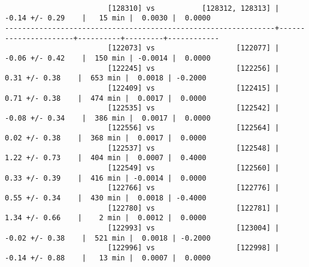 \documentclass[landscape]{article}
\newenvironment{slide}{\mbox{ }\vfill}{\vfill \mbox{ } \pagebreak}
\begin{document}
\begin{slide}
\begin{verbatim}
                        [128310] vs           [128312, 128313] |    -0.14 +/- 0.29    |   15 min |  0.0030 |  0.0000
---------------------------------------------------------------+----------------------+----------+---------+------------
                        [122073] vs                   [122077] |    -0.06 +/- 0.42    |  150 min | -0.0014 |  0.0000
                        [122245] vs                   [122256] |     0.31 +/- 0.38    |  653 min |  0.0018 | -0.2000
                        [122409] vs                   [122415] |     0.71 +/- 0.38    |  474 min |  0.0017 |  0.0000
                        [122535] vs                   [122542] |    -0.08 +/- 0.34    |  386 min |  0.0017 |  0.0000
                        [122556] vs                   [122564] |     0.02 +/- 0.38    |  368 min |  0.0017 |  0.0000
                        [122537] vs                   [122548] |     1.22 +/- 0.73    |  404 min |  0.0007 |  0.4000
                        [122549] vs                   [122560] |     0.33 +/- 0.39    |  416 min | -0.0014 |  0.0000
                        [122766] vs                   [122776] |     0.55 +/- 0.34    |  430 min |  0.0018 | -0.4000
                        [122780] vs                   [122781] |     1.34 +/- 0.66    |    2 min |  0.0012 |  0.0000
                        [122993] vs                   [123004] |    -0.02 +/- 0.38    |  521 min |  0.0018 | -0.2000
                        [122996] vs                   [122998] |    -0.14 +/- 0.88    |   13 min |  0.0007 |  0.0000
\end{verbatim}
\end{slide}
\end{document}
